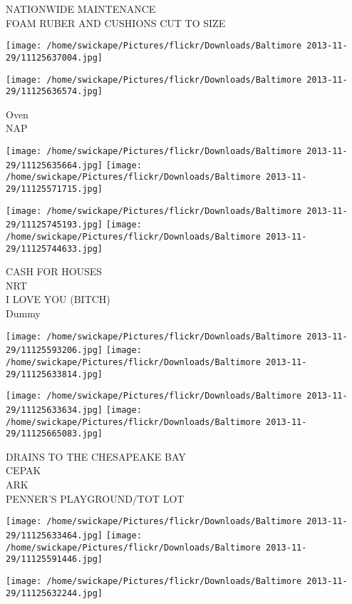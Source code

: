\documentclass[10pt,letterpaper]{article}
\begin{document}
NATIONWIDE MAINTENANCE\\
FOAM RUBER AND CUSHIONS CUT TO SIZE
\pagebreak

\texttt{[image: /home/swickape/Pictures/flickr/Downloads/Baltimore 2013-11-29/11125637004.jpg]}

\vspace{0.25in}
\texttt{[image: /home/swickape/Pictures/flickr/Downloads/Baltimore 2013-11-29/11125636574.jpg]}

Oven\\
NAP
\pagebreak

\texttt{[image: /home/swickape/Pictures/flickr/Downloads/Baltimore 2013-11-29/11125635664.jpg]}
\texttt{[image: /home/swickape/Pictures/flickr/Downloads/Baltimore 2013-11-29/11125571715.jpg]}

\texttt{[image: /home/swickape/Pictures/flickr/Downloads/Baltimore 2013-11-29/11125745193.jpg]}
\texttt{[image: /home/swickape/Pictures/flickr/Downloads/Baltimore 2013-11-29/11125744633.jpg]}

CASH FOR HOUSES\\
NRT\\
I LOVE YOU (BITCH)\\
Dummy
\pagebreak

\texttt{[image: /home/swickape/Pictures/flickr/Downloads/Baltimore 2013-11-29/11125593206.jpg]}
\texttt{[image: /home/swickape/Pictures/flickr/Downloads/Baltimore 2013-11-29/11125633814.jpg]}

\texttt{[image: /home/swickape/Pictures/flickr/Downloads/Baltimore 2013-11-29/11125633634.jpg]}
\texttt{[image: /home/swickape/Pictures/flickr/Downloads/Baltimore 2013-11-29/11125665083.jpg]}

DRAINS TO THE CHESAPEAKE BAY\\
CEPAK\\
ARK\\
PENNER'S PLAYGROUND/TOT LOT
\pagebreak

\texttt{[image: /home/swickape/Pictures/flickr/Downloads/Baltimore 2013-11-29/11125633464.jpg]}
\texttt{[image: /home/swickape/Pictures/flickr/Downloads/Baltimore 2013-11-29/11125591446.jpg]}

\vspace{0.25in}
\texttt{[image: /home/swickape/Pictures/flickr/Downloads/Baltimore 2013-11-29/11125632244.jpg]}
\end{document}
